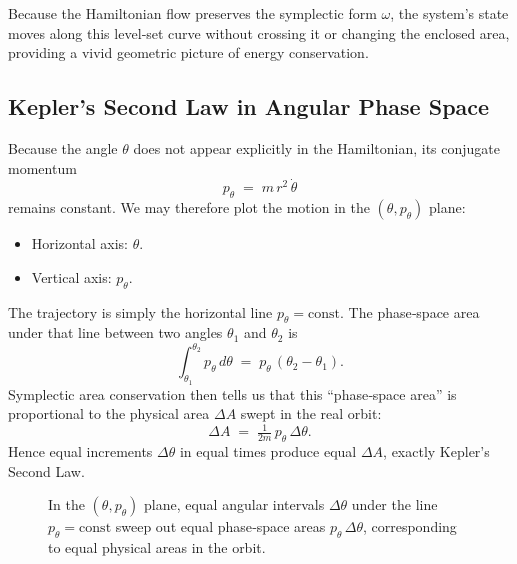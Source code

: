 Because the Hamiltonian flow preserves the symplectic form \(\omega\), the system’s state moves along this level‐set curve without crossing it or changing the enclosed area, providing a vivid geometric picture of energy conservation.  







\subsection{Kepler’s Second Law in Angular Phase Space}

Because the angle \(\theta\) does not appear explicitly in the Hamiltonian, its conjugate momentum
\[
p_\theta \;=\; m\,r^2\,\dot\theta
\]
remains constant.  We may therefore plot the motion in the \((\theta,p_\theta)\) plane:

\begin{itemize}
  \item Horizontal axis: \(\theta\).
  \item Vertical axis: \(p_\theta\).
\end{itemize}

The trajectory is simply the horizontal line \(p_\theta=\text{const}\).  The phase‐space area under that line between two angles \(\theta_1\) and \(\theta_2\) is
\[
\int_{\theta_1}^{\theta_2} p_\theta\,d\theta
\;=\;
p_\theta\,(\theta_2-\theta_1).
\]
Symplectic area conservation then tells us that this “phase‐space area” is proportional to the physical area \(\Delta A\) swept in the real orbit:
\[
\Delta A \;=\;\tfrac{1}{2m}\,p_\theta\,\Delta\theta.
\]
Hence equal increments \(\Delta\theta\) in equal times produce equal \(\Delta A\), exactly Kepler’s Second Law.

\begin{figure}[H]
\centering
{}
\caption{In the \((\theta,p_\theta)\) plane, equal angular intervals \(\Delta\theta\) under the line \(p_\theta=\mathrm{const}\) sweep out equal phase‐space areas \(p_\theta\,\Delta\theta\), corresponding to equal physical areas in the orbit.}
\end{figure}

